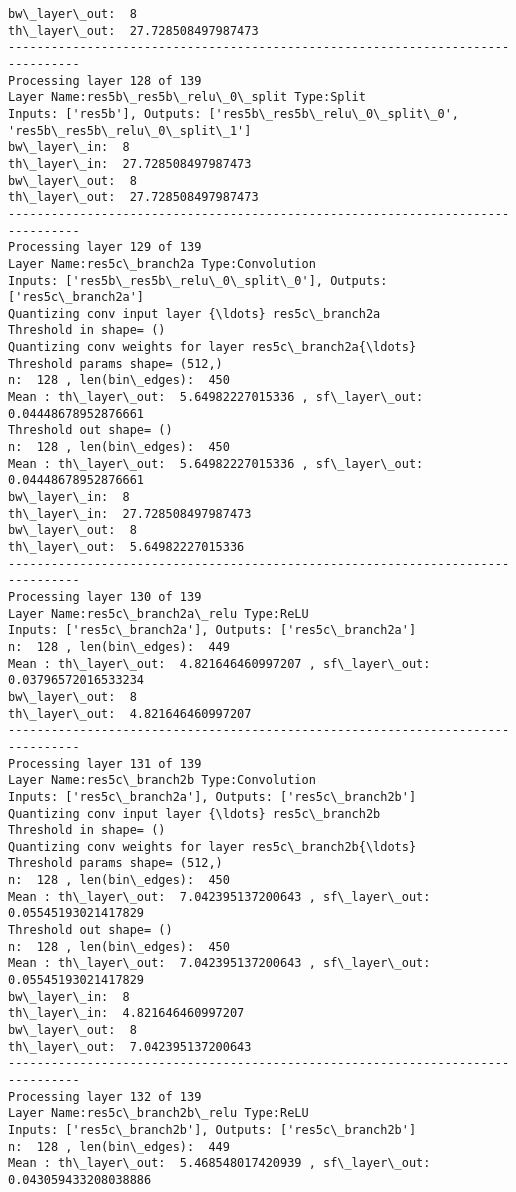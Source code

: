 \documentclass[11pt]{article}
\begin{document}
\begin{Verbatim}[commandchars=\\\{\}]
bw\_layer\_out:  8
th\_layer\_out:  27.728508497987473
--------------------------------------------------------------------------------
Processing layer 128 of 139
Layer Name:res5b\_res5b\_relu\_0\_split Type:Split
Inputs: ['res5b'], Outputs: ['res5b\_res5b\_relu\_0\_split\_0', 'res5b\_res5b\_relu\_0\_split\_1']
bw\_layer\_in:  8
th\_layer\_in:  27.728508497987473
bw\_layer\_out:  8
th\_layer\_out:  27.728508497987473
--------------------------------------------------------------------------------
Processing layer 129 of 139
Layer Name:res5c\_branch2a Type:Convolution
Inputs: ['res5b\_res5b\_relu\_0\_split\_0'], Outputs: ['res5c\_branch2a']
Quantizing conv input layer {\ldots} res5c\_branch2a
Threshold in shape= ()
Quantizing conv weights for layer res5c\_branch2a{\ldots}
Threshold params shape= (512,)
n:  128 , len(bin\_edges):  450
Mean : th\_layer\_out:  5.64982227015336 , sf\_layer\_out:  0.04448678952876661
Threshold out shape= ()
n:  128 , len(bin\_edges):  450
Mean : th\_layer\_out:  5.64982227015336 , sf\_layer\_out:  0.04448678952876661
bw\_layer\_in:  8
th\_layer\_in:  27.728508497987473
bw\_layer\_out:  8
th\_layer\_out:  5.64982227015336
--------------------------------------------------------------------------------
Processing layer 130 of 139
Layer Name:res5c\_branch2a\_relu Type:ReLU
Inputs: ['res5c\_branch2a'], Outputs: ['res5c\_branch2a']
n:  128 , len(bin\_edges):  449
Mean : th\_layer\_out:  4.821646460997207 , sf\_layer\_out:  0.03796572016533234
bw\_layer\_out:  8
th\_layer\_out:  4.821646460997207
--------------------------------------------------------------------------------
Processing layer 131 of 139
Layer Name:res5c\_branch2b Type:Convolution
Inputs: ['res5c\_branch2a'], Outputs: ['res5c\_branch2b']
Quantizing conv input layer {\ldots} res5c\_branch2b
Threshold in shape= ()
Quantizing conv weights for layer res5c\_branch2b{\ldots}
Threshold params shape= (512,)
n:  128 , len(bin\_edges):  450
Mean : th\_layer\_out:  7.042395137200643 , sf\_layer\_out:  0.05545193021417829
Threshold out shape= ()
n:  128 , len(bin\_edges):  450
Mean : th\_layer\_out:  7.042395137200643 , sf\_layer\_out:  0.05545193021417829
bw\_layer\_in:  8
th\_layer\_in:  4.821646460997207
bw\_layer\_out:  8
th\_layer\_out:  7.042395137200643
--------------------------------------------------------------------------------
Processing layer 132 of 139
Layer Name:res5c\_branch2b\_relu Type:ReLU
Inputs: ['res5c\_branch2b'], Outputs: ['res5c\_branch2b']
n:  128 , len(bin\_edges):  449
Mean : th\_layer\_out:  5.468548017420939 , sf\_layer\_out:  0.043059433208038886

\end{Verbatim}
\end{document}
